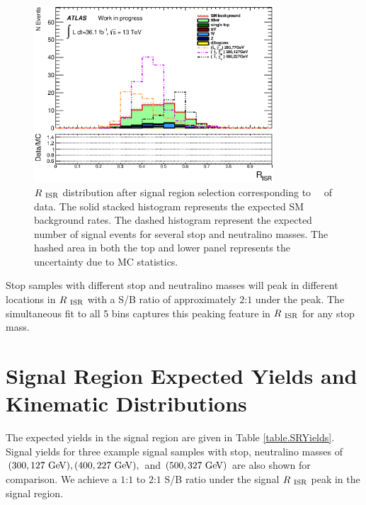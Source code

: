 \begin{figure}[h!]
  \begin{center}
     \includegraphics[width=0.80\textwidth]{figures/plotSR/SR_ND1_RISR_7SR.eps}
  \caption[$\RISR$ distribution after signal region selection corresponding to \intlumi\ \ifb\ of data]{ $\RISR$ distribution after signal region selection corresponding to \intlumi\ \ifb\ of data. The solid stacked histogram represents the expected SM background rates. The dashed histogram represent the expected number of signal events for several stop and neutralino masses. The hashed area in both the top and lower panel represents the uncertainty due to MC statistics.}
  \label{fig:SR:RISR1}
  \end{center}
\end{figure}

\indent Stop samples with different stop and neutralino masses will peak in different locations in $\RISR$ with a S/B ratio of approximately $2$:$1$ under the peak.  The simultaneous fit to all 5 bins captures this peaking feature in $\RISR$ for any stop mass.  \\

\section{Signal Region Expected Yields and Kinematic Distributions}
\label{sec:SR:Yields}

\indent The expected yields in the signal region are given in Table \ref{table.SRYields}.  Signal yields for three example signal samples with stop, neutralino masses of $(300,127 \gev), (400,227\gev), $ and $(500,327 \gev)$ are also shown for comparison.  We achieve a $1$:$1$ to $2$:$1$ S/B ratio under the signal $\RISR$ peak in the signal region. \\

